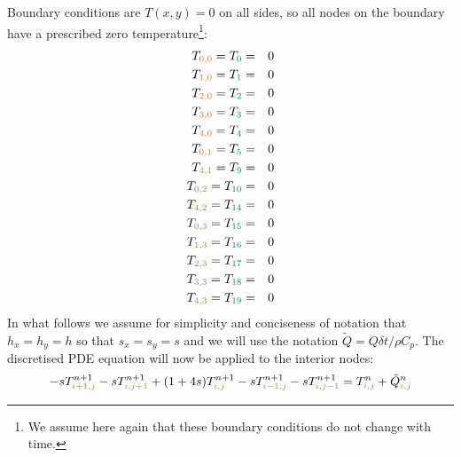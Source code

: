 Boundary conditions are $T(x,y)=0$ on all sides, so all nodes 
on the boundary have a prescribed zero temperature\footnote{We assume
here again that these boundary conditions do not change with time.}:
\begin{eqnarray}
T_{\color{brown}0,0} = T_{\color{teal} 0} &=& 0 \nonumber\\
T_{\color{brown}1,0} = T_{\color{teal} 1} &=& 0 \nonumber\\
T_{\color{brown}2,0} = T_{\color{teal} 2} &=& 0 \nonumber\\
T_{\color{brown}3,0} = T_{\color{teal} 3} &=& 0 \nonumber\\
T_{\color{brown}4,0} = T_{\color{teal} 4} &=& 0 \nonumber\\
T_{\color{brown}0,1} = T_{\color{teal} 5} &=& 0 \nonumber\\
T_{\color{brown}4,1} = T_{\color{teal} 9} &=& 0 \nonumber\\
T_{\color{brown}0,2} = T_{\color{teal} 10} &=& 0 \nonumber\\
T_{\color{brown}4,2} = T_{\color{teal} 14} &=& 0 \nonumber\\
T_{\color{brown}0,3} = T_{\color{teal} 15} &=& 0 \nonumber\\
T_{\color{brown}1,3} = T_{\color{teal} 16} &=& 0 \nonumber\\
T_{\color{brown}2,3} = T_{\color{teal} 17} &=& 0 \nonumber\\
T_{\color{brown}3,3} = T_{\color{teal} 18} &=& 0 \nonumber\\
T_{\color{brown}4,3} = T_{\color{teal} 19} &=& 0 \nonumber
\end{eqnarray}
In what follows we assume for simplicity and conciseness of notation that 
$h_x=h_y=h$ so that $s_x=s_y=s$ and we will use the notation $\tilde{Q}=Q \delta t/\rho C_p$.
The discretised PDE equation will now be applied to the interior nodes:
\[
-s T_{{\color{brown} i+1,j}}^{n+1}
-s T_{{\color{brown}i,j+1}}^{n+1} 
+(1+4s)T_{{\color{brown}i,j}}^{n+1} 
-s T_{{\color{brown}i-1,j}}^{n+1} 
-s T_{{\color{brown}i,j-1}}^{n+1} 
= T_{{\color{brown}i,j}}^n 
+\tilde{Q}_{{\color{brown}i,j}}^n
\]


